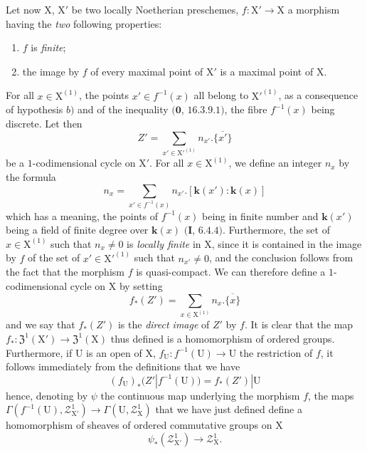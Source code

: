 \begin{env}[21.10.14]
\label{IV.21.10.14}
Let now $\mathrm{X}$, $\mathrm{X}'$ be two locally Noetherian preschemes, $f:\mathrm{X}'\to\mathrm{X}$ a morphism having the \emph{two} following properties:
\begin{enumerate}[label=\emph{\alph*)}]
  \item $f$ is \emph{finite};
  \item the image by $f$ of every maximal point of $\mathrm{X}'$ is a maximal point of $\mathrm{X}$.
\end{enumerate}

For all $x\in\mathrm{X}^{(1)}$, the points $x'\in f^{-1}(x)$ all belong to $\mathrm{X}'^{(1)}$, as a consequence of hypothesis $b)$ and of the inequality $(\mathbf{0}$, $16.3.9.1)$, the fibre $f^{-1}(x)$ being discrete.
Let then
\[
  Z'=\sum_{x'\in\mathrm{X}'^{(1)}} n_{x'}.\overline{\{x'\}}
\]
be a $1$-codimensional cycle on $\mathrm{X}'$.
For all $x\in\mathrm{X}^{(1)}$, we define an integer $n_x$ by the formula
\[
  n_x=\sum_{x'\in f^{-1}(x)} n_{x'}.[\boldsymbol{k}(x'):\boldsymbol{k}(x)]
\]
which has a meaning, the points of $f^{-1}(x)$ being in finite number and $\boldsymbol{k}(x')$ being a field of finite degree over $\boldsymbol{k}(x)$ $(\mathbf{I}$, $6.4.4)$.
Furthermore, the set of $x\in\mathrm{X}^{(1)}$ such that $n_x\neq 0$ is \emph{locally finite} in $\mathrm{X}$, since it is contained in the image by $f$ of the set of $x'\in\mathrm{X}'^{(1)}$ such that $n_{x'}\neq 0$, and the conclusion follows from the fact that the morphism $f$ is quasi-compact.
We can therefore define a $1$-codimensional cycle on $\mathrm{X}$ by setting
\[
\label{IV.21.10.14.1}
  f_*(Z')=\sum_{x\in\mathrm{X}^{(1)}} n_x.\overline{\{x\}}
  \tag{21.10.14.1}
\]
and we say that $f_*(Z')$ is the \emph{direct image} of $Z'$ by $f$.
It is clear that the map $f_*:\mathfrak{Z}^1(\mathrm{X}')\to\mathfrak{Z}^1(\mathrm{X})$ thus defined is a homomorphism of ordered groups.
Furthermore, if $\mathrm{U}$ is an open of $\mathrm{X}$, $f_{\mathrm{U}}:f^{-1}(\mathrm{U})\to\mathrm{U}$ the restriction of $f$, it follows immediately from the definitions that we have
\[
\label{IV.21.10.14.2}
  (f_{\mathrm{U}})_*(Z'|f^{-1}(\mathrm{U}))=f_*(Z')|\mathrm{U}
  \tag{21.10.14.2}
\]
hence, denoting by $\psi$ the continuous map underlying the morphism $f$, the maps $\Gamma(f^{-1}(\mathrm{U}),\mathscr{Z}^1_{\mathrm{X}'})\to\Gamma(\mathrm{U},\mathscr{Z}^1_{\mathrm{X}})$ that we have just defined define a homomorphism of sheaves of ordered commutative groups on $\mathrm{X}$
\[
  \psi_*(\mathscr{Z}^1_{\mathrm{X}'})\to\mathscr{Z}^1_{\mathrm{X}}.
\]
\end{env}

